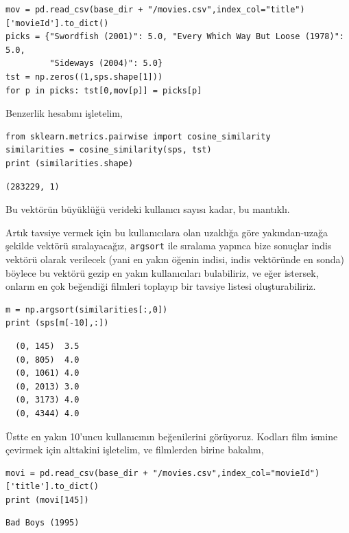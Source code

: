 \documentclass[12pt,fleqn]{article}\usepackage{../../common}
\begin{document}
\begin{verbatim}
mov = pd.read_csv(base_dir + "/movies.csv",index_col="title")['movieId'].to_dict()
picks = {"Swordfish (2001)": 5.0, "Every Which Way But Loose (1978)": 5.0,
         "Sideways (2004)": 5.0}
tst = np.zeros((1,sps.shape[1]))
for p in picks: tst[0,mov[p]] = picks[p]
\end{verbatim}

Benzerlik hesabını işletelim,

\begin{verbatim}
from sklearn.metrics.pairwise import cosine_similarity
similarities = cosine_similarity(sps, tst)
print (similarities.shape)
\end{verbatim}

\begin{verbatim}
(283229, 1)
\end{verbatim}

Bu vektörün büyüklüğü verideki kullanıcı sayısı kadar, bu mantıklı.

Artık tavsiye vermek için bu kullanıcılara olan uzaklığa göre yakından-uzağa
şekilde vektörü sıralayacağız, \verb!argsort! ile sıralama yapınca bize sonuçlar
indis vektörü olarak verilecek (yani en yakın öğenin indisi, indis vektöründe en
sonda) böylece bu vektörü gezip en yakın kullanıcıları bulabiliriz, ve eğer
istersek, onların en çok beğendiği filmleri toplayıp bir tavsiye listesi
oluşturabiliriz.

\begin{verbatim}
m = np.argsort(similarities[:,0])
print (sps[m[-10],:])
\end{verbatim}

\begin{verbatim}
  (0, 145)	3.5
  (0, 805)	4.0
  (0, 1061)	4.0
  (0, 2013)	3.0
  (0, 3173)	4.0
  (0, 4344)	4.0
\end{verbatim}

Üstte en yakın 10'uncu kullanıcının beğenilerini görüyoruz. Kodları film ismine 
çevirmek için alttakini işletelim, ve filmlerden birine bakalım,

\begin{verbatim}
movi = pd.read_csv(base_dir + "/movies.csv",index_col="movieId")['title'].to_dict()
print (movi[145])
\end{verbatim}

\begin{verbatim}
Bad Boys (1995)
\end{verbatim}
\end{document}
